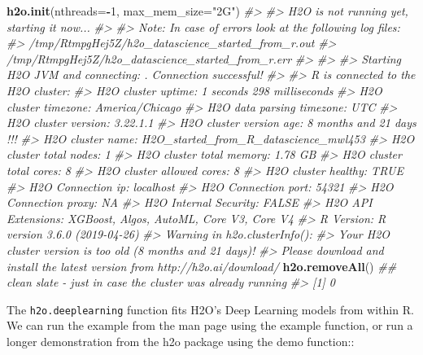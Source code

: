 \documentclass[]{book}
\newenvironment{Shaded}{\begin{snugshade}}{\end{snugshade}}
\newcommand{\CommentTok}[1]{\textcolor[rgb]{0.56,0.35,0.01}{\textit{#1}}}
\newcommand{\DataTypeTok}[1]{\textcolor[rgb]{0.13,0.29,0.53}{#1}}
\newcommand{\DecValTok}[1]{\textcolor[rgb]{0.00,0.00,0.81}{#1}}
\newcommand{\KeywordTok}[1]{\textcolor[rgb]{0.13,0.29,0.53}{\textbf{#1}}}
\newcommand{\NormalTok}[1]{#1}
\newcommand{\OperatorTok}[1]{\textcolor[rgb]{0.81,0.36,0.00}{\textbf{#1}}}
\newcommand{\StringTok}[1]{\textcolor[rgb]{0.31,0.60,0.02}{#1}}
\begin{document}
\begin{Shaded}
\begin{Highlighting}[]
\KeywordTok{h2o.init}\NormalTok{(}\DataTypeTok{nthreads=}\OperatorTok{-}\DecValTok{1}\NormalTok{, }\DataTypeTok{max_mem_size=}\StringTok{"2G"}\NormalTok{)}
\CommentTok{#> }
\CommentTok{#> H2O is not running yet, starting it now...}
\CommentTok{#> }
\CommentTok{#> Note:  In case of errors look at the following log files:}
\CommentTok{#>     /tmp/RtmpgHej5Z/h2o_datascience_started_from_r.out}
\CommentTok{#>     /tmp/RtmpgHej5Z/h2o_datascience_started_from_r.err}
\CommentTok{#> }
\CommentTok{#> }
\CommentTok{#> Starting H2O JVM and connecting: . Connection successful!}
\CommentTok{#> }
\CommentTok{#> R is connected to the H2O cluster: }
\CommentTok{#>     H2O cluster uptime:         1 seconds 298 milliseconds }
\CommentTok{#>     H2O cluster timezone:       America/Chicago }
\CommentTok{#>     H2O data parsing timezone:  UTC }
\CommentTok{#>     H2O cluster version:        3.22.1.1 }
\CommentTok{#>     H2O cluster version age:    8 months and 21 days !!! }
\CommentTok{#>     H2O cluster name:           H2O_started_from_R_datascience_mwl453 }
\CommentTok{#>     H2O cluster total nodes:    1 }
\CommentTok{#>     H2O cluster total memory:   1.78 GB }
\CommentTok{#>     H2O cluster total cores:    8 }
\CommentTok{#>     H2O cluster allowed cores:  8 }
\CommentTok{#>     H2O cluster healthy:        TRUE }
\CommentTok{#>     H2O Connection ip:          localhost }
\CommentTok{#>     H2O Connection port:        54321 }
\CommentTok{#>     H2O Connection proxy:       NA }
\CommentTok{#>     H2O Internal Security:      FALSE }
\CommentTok{#>     H2O API Extensions:         XGBoost, Algos, AutoML, Core V3, Core V4 }
\CommentTok{#>     R Version:                  R version 3.6.0 (2019-04-26)}
\CommentTok{#> Warning in h2o.clusterInfo(): }
\CommentTok{#> Your H2O cluster version is too old (8 months and 21 days)!}
\CommentTok{#> Please download and install the latest version from http://h2o.ai/download/}
\KeywordTok{h2o.removeAll}\NormalTok{() }\CommentTok{## clean slate - just in case the cluster was already running}
\CommentTok{#> [1] 0}
\end{Highlighting}
\end{Shaded}

The \texttt{h2o.deeplearning} function fits H2O's Deep Learning models from within R. We can run the example from the man page using the example function, or run a longer demonstration from the h2o package using the demo function::
\end{document}
